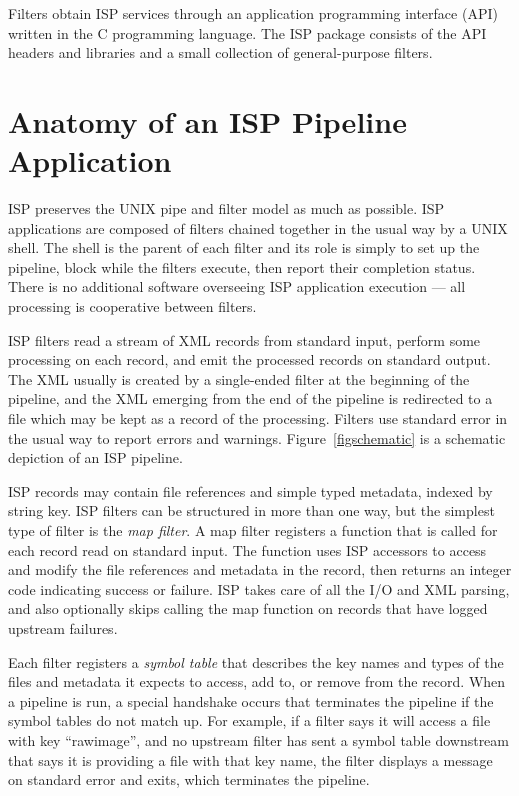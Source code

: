 \documentclass{article}
\begin{document}
Filters obtain ISP services through an application programming 
interface (API) written in the C programming language.
The ISP package consists of the API headers and libraries and a small
collection of general-purpose filters.

\section{Anatomy of an ISP Pipeline Application}

ISP preserves the UNIX pipe and filter model as much as possible.
ISP applications are composed of filters chained together in the usual
way by a UNIX shell.  The shell is the parent of each filter and
its role is simply to set up the pipeline, block while the filters execute,
then report their completion status.  There is no additional software 
overseeing ISP application execution --- all processing is cooperative between
filters.

ISP filters read a stream of XML records from standard input, perform some
processing on each record, and emit the processed records on standard output.
The XML usually is created by a single-ended filter at the beginning of the 
pipeline, and the XML emerging from the end of the pipeline is redirected 
to a file which may be kept as a record of the processing.
Filters use standard error in the usual way to report errors and warnings.
Figure~\ref{figschematic} is a schematic depiction of an ISP pipeline.

ISP records may contain file references and simple typed metadata, 
indexed by string key.  ISP filters can be structured in more than
one way, but the simplest type of filter is the {\em map filter}.
A map filter registers a function that is called for each record read on
standard input.  The function uses ISP accessors to access and modify the 
file references and metadata in the record, then returns an integer code 
indicating success or failure.  ISP takes care of all the I/O and XML 
parsing, and also optionally skips calling the map function on records 
that have logged upstream failures.

Each filter registers a {\em symbol table} that describes the key names and 
types of the files and metadata it expects to access, add to, or remove 
from the record.  When a pipeline is run, a special handshake occurs that
terminates the pipeline if the symbol tables do not match up.  For example,
if a filter says it will access a file with key ``rawimage'', and no upstream
filter has sent a symbol table downstream that says it is providing a file 
with that key name, the filter displays a message on standard error and 
exits, which terminates the pipeline.
\end{document}
